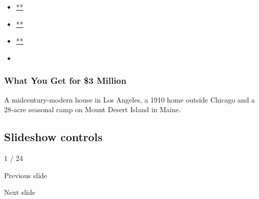 \begin{itemize}
\item
  \href{https://www.facebook.com/sharer.php?app_id=9869919170\&u=https\%3A\%2F\%2Fwww.nytimes.com\%2Fslideshow\%2F2020\%2F07\%2F29\%2Frealestate\%2Fwhat-you-get-for-3-million.html\%3Fsmid\%3Dfb-share\&name=What\%20You\%20Get\%20for\%20\%243\%20Million\&redirect_uri=https\%3A\%2F\%2Fwww.facebook.com\%2F}{**}
\item
  \href{https://twitter.com/intent/tweet?url=https\%3A\%2F\%2Fwww.nytimes.com\%2Fslideshow\%2F2020\%2F07\%2F29\%2Frealestate\%2Fwhat-you-get-for-3-million.html\%3Fsmid\%3Dtw-share\&text=What\%20You\%20Get\%20for\%20\%243\%20Million}{**}
\item
  \href{mailto:?subject=NYTimes.com\%3A\%20What\%20You\%20Get\%20for\%20\%243\%20Million\&body=From\%20The\%20New\%20York\%20Times\%3A\%0A\%0AWhat\%20You\%20Get\%20for\%20\%243\%20Million\%0A\%0AA\%20midcentury-modern\%20house\%20in\%20Los\%20Angeles\%2C\%20a\%201910\%20home\%20outside\%20Chicago\%20and\%20a\%2028-acre\%20seasonal\%20camp\%20on\%20Mount\%20Desert\%20Island\%20in\%20Maine.\%0A\%0Ahttps\%3A\%2F\%2Fwww.nytimes.com\%2Fslideshow\%2F2020\%2F07\%2F29\%2Frealestate\%2Fwhat-you-get-for-3-million.html\%3Fsmid\%3Dem-share}{**}
\item
\end{itemize}

\hypertarget{what-you-get-for-3-million-1}{%
\subsubsection{What You Get for \$3
Million}\label{what-you-get-for-3-million-1}}

A midcentury-modern house in Los Angeles, a 1910 home outside Chicago
and a 28-acre seasonal camp on Mount Desert Island in Maine.

\hypertarget{slideshow-controls}{%
\subsection{Slideshow controls}\label{slideshow-controls}}

1 / 24

Previous slide

Next slide
